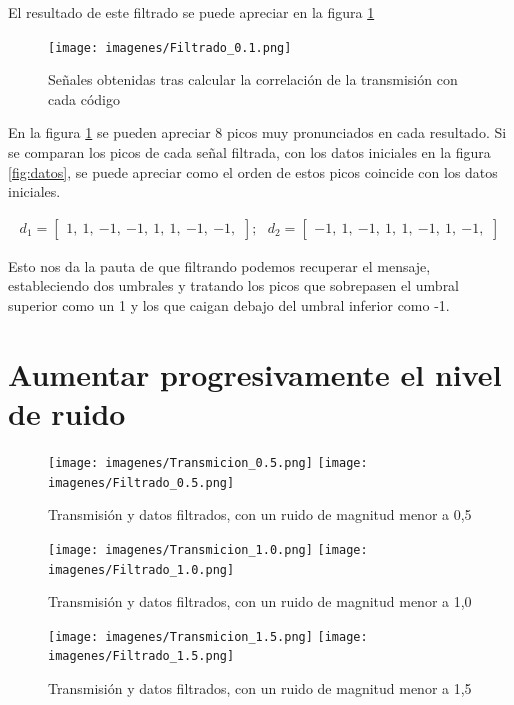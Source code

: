 \documentclass[12pt,letterpaper]{article}     %
\begin{document}
El resultado de este filtrado se puede apreciar en la figura \ref{fig:filtro0,1}

\begin{figure}[!ht]
\centering
\texttt{[image: imagenes/Filtrado\_0.1.png]}
\caption{Señales obtenidas tras calcular la correlación de la transmisión con cada código}
\label{fig:filtro0,1}
\end{figure}

En la figura \ref{fig:filtro0,1} se pueden apreciar 8 picos muy pronunciados en cada resultado.
Si se comparan los picos de cada señal filtrada, con los datos iniciales en la figura \ref{fig:datos},
se puede apreciar como el orden de estos picos coincide con los datos iniciales.

\begin{align*}
	d_{1} =
	\begin{bmatrix}
		{1,}\ 
		{1,}\ 
		{-1,}\ 
		{-1,}\ 
		{1,}\ 
		{1,}\ 
		{-1,}\ 
		{-1,}
	\end{bmatrix};\ \ \ 
	d_{2} =
	\begin{bmatrix}
		{-1,}\ 
		{1,}\ 
		{-1,}\ 
		{1,}\ 
		{1,}\ 
		{-1,}\ 
		{1,}\ 
		{-1,}
	\end{bmatrix}
\end{align*}

Esto nos da la pauta de que filtrando podemos recuperar el mensaje, estableciendo dos umbrales
y tratando los picos que sobrepasen el umbral superior como un 1 y los que caigan debajo del 
umbral inferior como -1.

\newpage
\section{Aumentar progresivamente el nivel de ruido}

\begin{figure}[!ht]
\centering
\texttt{[image: imagenes/Transmicion\_0.5.png]}
\texttt{[image: imagenes/Filtrado\_0.5.png]}
\caption{Transmisión y datos filtrados, con un ruido de magnitud menor a 0,5}
\label{fig:filtro05}
\end{figure}

\begin{figure}[!ht]
\centering
\texttt{[image: imagenes/Transmicion\_1.0.png]}
\texttt{[image: imagenes/Filtrado\_1.0.png]}
\caption{Transmisión y datos filtrados, con un ruido de magnitud menor a 1,0}
\label{fig:filtro10}
\end{figure}

\begin{figure}[!ht]
\centering
\texttt{[image: imagenes/Transmicion\_1.5.png]}
\texttt{[image: imagenes/Filtrado\_1.5.png]}
\caption{Transmisión y datos filtrados, con un ruido de magnitud menor a 1,5}
\label{fig:filtro15}
\end{figure}
\end{document}
